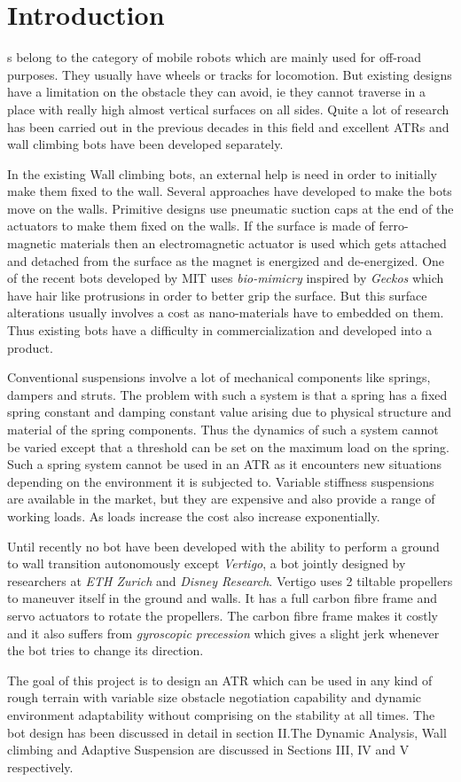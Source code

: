 \section{Introduction}

s  belong to the category of mobile robots which are mainly used for off-road purposes. They usually have wheels or tracks for locomotion. But existing designs have a limitation on the obstacle they can avoid, ie they cannot traverse in a place with really high almost vertical surfaces on all sides. Quite a lot of research has been carried out in the previous decades in this field and excellent ATRs and wall climbing bots have been developed separately.

In the existing Wall climbing bots, an external help is need in order to initially make them fixed to the wall. Several approaches have developed to make the bots move on the walls. Primitive designs use pneumatic suction caps at the end of the actuators to make them fixed on the walls. If the surface is made of ferro-magnetic materials then an electromagnetic actuator is used which gets attached and detached from the surface as the magnet is energized and de-energized. One of the recent bots developed by MIT uses \textit{bio-mimicry} inspired by \textit{Geckos} which have hair like protrusions in order to better grip the surface. But this surface alterations usually involves a cost as nano-materials have to embedded on them. Thus existing bots have a difficulty in commercialization and developed into a product.

Conventional suspensions involve a lot of mechanical components like springs, dampers and struts. The problem with such a system is that a spring has a fixed spring constant and damping constant value arising due to physical structure and material of the spring components. Thus the dynamics of such a system cannot be varied except that a threshold can be set on the maximum load on the spring. Such a spring system cannot be used in an ATR as it encounters new situations depending on the environment it is subjected to. Variable stiffness suspensions are available in the market, but they are expensive and also provide a range of working loads. As loads increase the cost also increase exponentially.

Until recently no bot have been developed with the ability to perform a ground to wall transition autonomously  except \textit{Vertigo}, a bot jointly designed by researchers at \textit{ETH Zurich} and \textit{Disney Research}. Vertigo uses 2 tiltable propellers to maneuver itself in the ground and walls. It has a full carbon fibre frame and servo actuators to rotate the propellers. The carbon fibre frame makes it costly and it also suffers from \textit{gyroscopic precession} which gives a slight jerk whenever the bot tries to change its direction.

The goal of this project is to design an ATR which can be used in any kind of rough terrain with variable size obstacle negotiation capability and dynamic environment adaptability without comprising on the stability at all times. The bot design has been discussed in detail in section II.The Dynamic Analysis, Wall climbing and Adaptive Suspension are discussed in Sections III, IV and V respectively. 
